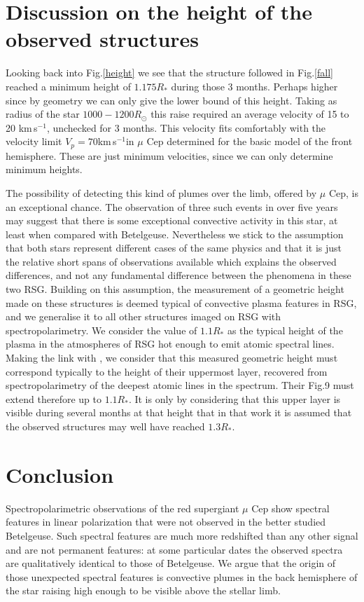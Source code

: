 \documentclass{/Users/art2/TeX/aanda/aa}
\def\kms {km\,s$^{-1}$}
\begin{document}
\section{Discussion on the height of the observed structures} 


Looking back into Fig.\ref{height} we see that the structure followed in Fig.\ref{fall} reached a minimum height of $1.175R_*$ during those 3 months. Perhaps higher since by geometry we can only give the lower bound of this height. Taking as radius of the star $1000 - 1200 R_{\odot}$ this raise required an average velocity of 15 to 20 \kms, unchecked for 3 months. This velocity fits comfortably with the velocity limit $V_p=70$\kms  in $\mu$ Cep determined for the basic model of the front hemisphere. These are just minimum velocities, since we can only determine minimum heights.

The possibility of detecting this kind of plumes over the limb, offered by $\mu$ Cep, is an exceptional chance. The observation of three such events in over five years may suggest that there is some exceptional convective activity in this star, at least when compared with Betelgeuse. Nevertheless we stick to the assumption that both stars represent different cases of the same physics and that it is just the relative short spans of observations available which explains the observed differences, and not any fundamental difference between the phenomena in these two RSG. Building on this assumption,  the measurement of a geometric height made on these structures is deemed typical of  convective plasma features in RSG, and we generalise it to all other structures imaged on RSG with spectropolarimetry. We consider the  value of $1.1R_*$  as the typical height of the plasma in the atmospheres of RSG hot enough to emit atomic spectral lines. Making the link with \cite{LA22}, we consider that this measured geometric height must correspond typically to the height of their uppermost layer, recovered from spectropolarimetry of the deepest atomic lines in the spectrum. Their Fig.9 must extend therefore up to $1.1R_*$. It is only by considering that this upper layer is visible during several months at that height that in that work it is assumed that the observed structures may well have reached $1.3R_*$. 

\section{Conclusion}

Spectropolarimetric observations of the red supergiant $\mu$ Cep show spectral features in linear polarization that were not observed in the better studied Betelgeuse. Such spectral features are much more redshifted than any other signal and are not permanent features: at some particular dates the observed spectra are qualitatively identical to those of Betelgeuse. We argue that the origin of those unexpected spectral features is convective plumes in the back hemisphere of the star raising high enough to be visible above the stellar limb. 
\end{document}
